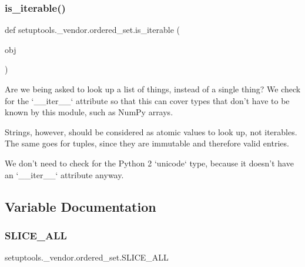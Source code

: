 \subsubsection{\texorpdfstring{is\+\_\+iterable()}{is\_iterable()}}
{\footnotesize\ttfamily def setuptools.\+\_\+vendor.\+ordered\+\_\+set.\+is\+\_\+iterable (\begin{DoxyParamCaption}\item[{}]{obj }\end{DoxyParamCaption})}

\begin{DoxyVerb}Are we being asked to look up a list of things, instead of a single thing?
We check for the `__iter__` attribute so that this can cover types that
don't have to be known by this module, such as NumPy arrays.

Strings, however, should be considered as atomic values to look up, not
iterables. The same goes for tuples, since they are immutable and therefore
valid entries.

We don't need to check for the Python 2 `unicode` type, because it doesn't
have an `__iter__` attribute anyway.
\end{DoxyVerb}
 

\subsection{Variable Documentation}
\mbox{\label{namespacesetuptools_1_1__vendor_1_1ordered__set_a71176dd52bbe2f4c416ba37f3efb4ed4}} 
\subsubsection{\texorpdfstring{S\+L\+I\+C\+E\+\_\+\+A\+LL}{SLICE\_ALL}}
{\footnotesize\ttfamily setuptools.\+\_\+vendor.\+ordered\+\_\+set.\+S\+L\+I\+C\+E\+\_\+\+A\+LL}

